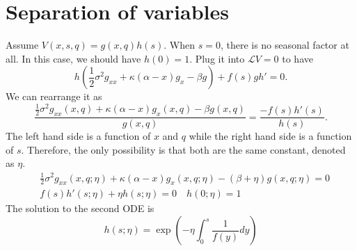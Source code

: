 \documentclass[paper=a4, fontsize=15pt]{scrartcl} %
\numberwithin{equation}{section} %
\numberwithin{figure}{section} %
\numberwithin{table}{section} %
\begin{document}
\section{Separation of variables}
Assume $V(x,s,q) = g(x,q)h(s)$. When $s = 0$, there is no seasonal factor at all. In this case, we should have $h(0) = 1$. Plug it into $\mathcal{L} V = 0$ to have
\begin{equation*}
  h\left(\frac{1}{2} \sigma^2 g_{xx} + \kappa (\alpha - x) g_x - \beta g\right) + f(s) g h' = 0.
\end{equation*}
We can rearrange it as
\begin{equation*}
  \frac{\frac{1}{2} \sigma^2 g_{xx}(x,q) + \kappa (\alpha - x) g_x(x,q) - \beta g(x,q)}{g(x,q)} = \frac{-f(s) h'(s)}{h(s)}.
\end{equation*}
The left hand side is a function of $x$ and $q$ while the right hand side is a function of $s$. Therefore, the only possibility is that both are the same constant, denoted as $\eta$.
\begin{equation*}
\begin{split}
  &\frac{1}{2} \sigma^2 g_{xx}(x,q;\eta) + \kappa (\alpha - x) g_x(x,q;\eta) - (\beta + \eta) g(x,q;\eta) = 0\\
  &f(s) h'(s;\eta) + \eta h(s;\eta) = 0 \quad h(0;\eta) = 1
\end{split}
\end{equation*}
The solution to the second ODE is 
\begin{equation}\label{Equation_h}
  h(s;\eta) = \exp(-\eta \int_{0}^{s} \frac{1}{f(y)}dy)
\end{equation}
\end{document}
